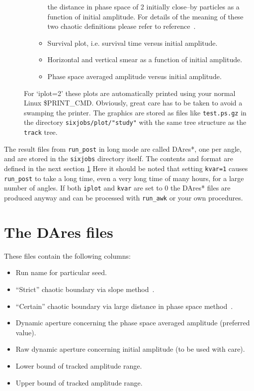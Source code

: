 \documentclass{cernatsnote}    %
\begin{document}
\begin{description}
\begin{itemize}
\begin{itemize}
      the distance in phase space of 2 initially close--by particles
      as a function of initial amplitude. For details of the meaning
      of these two chaotic definitions please refer to
      reference~\cite{LHC8}.
    \item Survival plot, i.e. survival time versus initial amplitude.
    \item Horizontal and vertical smear as a function of initial
      amplitude.
    \item Phase space averaged amplitude versus initial amplitude.
    \end{itemize}
  \end{itemize}
  For `iplot=2' these plots are automatically printed using
  your normal Linux \$PRINT\_CMD.
  Obviously, great care has to be taken to avoid a
  swamping the printer. The graphics are stored as files
  like {\tt test.ps.gz} in the directory  
  {\tt sixjobs/plot/"study"} with the same tree structure as the
  {\tt track} tree.
\end{description}

The result files from {\tt run\_post} in long mode are called DAres*,
one per angle, and are stored in the {\tt sixjobs} directory itself.
The contents and format are defined in the next section \ref{sec:DAres}
Here it should be noted that setting {\tt kvar=1}
causes {\tt run\_post} to take a long time, even a very long time of
many hours, for a large number of angles. If both {\tt iplot} and
{\tt kvar} are set to 0 the DAres* files are produced anyway
and can be processed with {\tt run\_awk} or your own procedures.

\section{The DAres files}
\label{sec:DAres}
These files contain the following columns:
\begin{itemize}
\item Run name for particular seed.
\item ``Strict'' chaotic boundary via slope method~\cite{LHC8}.
\item ``Certain'' chaotic boundary via large distance in phase space
  method~\cite{LHC8}.
\item Dynamic aperture concerning the phase space averaged amplitude
  (preferred value).
\item Raw dynamic aperture concerning initial amplitude (to be used
  with care).
\item Lower bound of tracked amplitude range.
\item Upper bound of tracked amplitude range.
\end{itemize}
\end{document}
